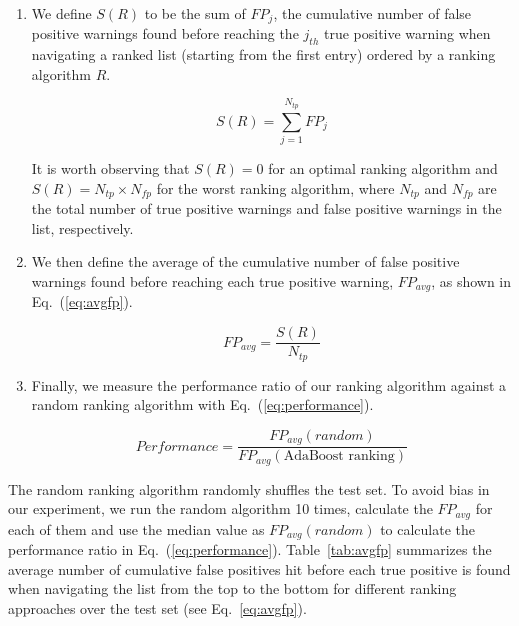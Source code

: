\begin{enumerate}

\item We define $S(R)$ to be the
sum of $FP_j$, the cumulative number of false positive warnings found before
reaching the $j_{th}$ true positive warning when navigating a ranked list
(starting from the first entry) ordered by a ranking algorithm $R$.

\begin{equation}\label{eq:sr}
  S\left(R\right) = \sum\limits_{j=1}^{N_{tp}} \mathit{FP}_j
\end{equation}

It is worth observing that $S\left(R\right) = 0$ for an optimal ranking algorithm and
$S\left(R\right) = N_{tp} \times N_{fp}$ for the worst ranking algorithm, where $N_{tp}$
and $N_{fp}$ are the total number of true positive warnings and false positive
warnings in the list, respectively.

\item We then define the average of the cumulative number of false positive
warnings found before reaching each true positive warning, $\mathit{FP}_{avg}$, as shown
in Eq.~(\ref{eq:avgfp}).

\begin{equation}\label{eq:avgfp}
  \mathit{FP}_{avg} = \frac{S\left(R\right)}{N_{tp}}
\end{equation}

\item Finally, we measure the performance ratio of our ranking algorithm against a random
ranking algorithm with Eq.~(\ref{eq:performance}).

\begin{equation}\label{eq:performance}
  \mathit{Performance} = \frac{\mathit{FP}_{avg}(\mathit{random})}{\mathit{FP}_{avg}(\text{AdaBoost ranking})}
\end{equation}

\end{enumerate}

The random ranking algorithm randomly shuffles the test set. To avoid bias in
our experiment, we run the random algorithm 10 times, calculate the
$\mathit{FP}_{avg}$ for each of them and use the median value as
$\mathit{FP}_{avg}(\mathit{random})$ to calculate the performance ratio in
Eq.~(\ref{eq:performance}). Table~\ref{tab:avgfp} summarizes the average number
of cumulative false positives hit before each true positive is found when
navigating the list from the top to the bottom for different ranking approaches
over the test set (see Eq.~\ref{eq:avgfp}).

